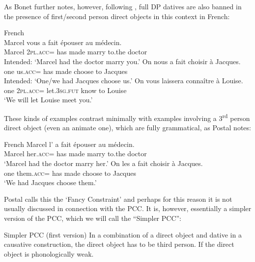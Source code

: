 \documentclass[output=paper,colorlinks,citecolor=brown,nonflat]{langsci/langscibook}
\begin{document}
As Bonet further notes, however, following \citet{Postal1989}, full DP datives are also banned in the presence of first/second person direct objects in this context in French:

\ea%
    \label{ex:sheehan:14}
    French \citep[2]{Postal1989}\\
    \ea\label{ex:sheehan:14a}
    \gll    *Marcel vous   a   fait   épouser   au     médecin.\\
            Marcel   2\textsc{pl}.\textsc{acc}=  has   made   marry   to.the   doctor\\
    \glt    Intended: ‘Marcel had the doctor marry you.’
    \ex\label{ex:sheehan:14b}
    \gll    *On   nous     a   fait     choisir   à Jacques.\\
            one     us.\textsc{acc}= has   made   choose   to Jacques\\
    \glt    Intended: ‘One/we had Jacques choose us.’
    \ex\label{ex:sheehan:14c}
    \gll    *On   vous   laissera   connaître   à Louise.\\
            one   2\textsc{pl}\textsc{.acc}=  let.\textsc{3sg.fut} know     to Louise\\
    \glt    ‘We will let Louise meet you.'
    \z
\z

These kinds of examples contrast minimally with examples involving a 3\textsuperscript{rd} person direct object (even an animate one), which are fully grammatical, as Postal notes:

\ea%
    \label{ex:sheehan:15}
    French \citep[2]{Postal1989}
    \ea\label{ex:sheehan:15a}
    \gll  Marcel   l’       a  fait    épouser   au     médecin.\\
            Marcel   her\textsc{.acc}=  has  made    marry   to.the   doctor\\
    \glt      ‘Marcel had the doctor marry her.’
    \ex\label{ex:sheehan:15b}
    \gll    On   les       a   fait     choisir   à Jacques.\\
            one   them.\textsc{acc}=  has   made   choose   to Jacques\\
    \glt    ‘We had Jacques choose them.’
    \z
\z

Postal calls this the ‘Fancy Constraint’ and perhaps for this reason it is not usually discussed in connection with the PCC. It is, however, essentially a simpler version of the PCC, which we will call the ``Simpler PCC'':

\ea%
    \label{ex:sheehan:16}
    Simpler PCC (first version)
    \ea\label{ex:sheehan:16a}
    In a combination of a direct object and dative in a causative construction, the direct object has to be third person.
    \ex\label{ex:sheehan:16b}
    If the direct object is phonologically weak.
    \z
\z
\end{document}
